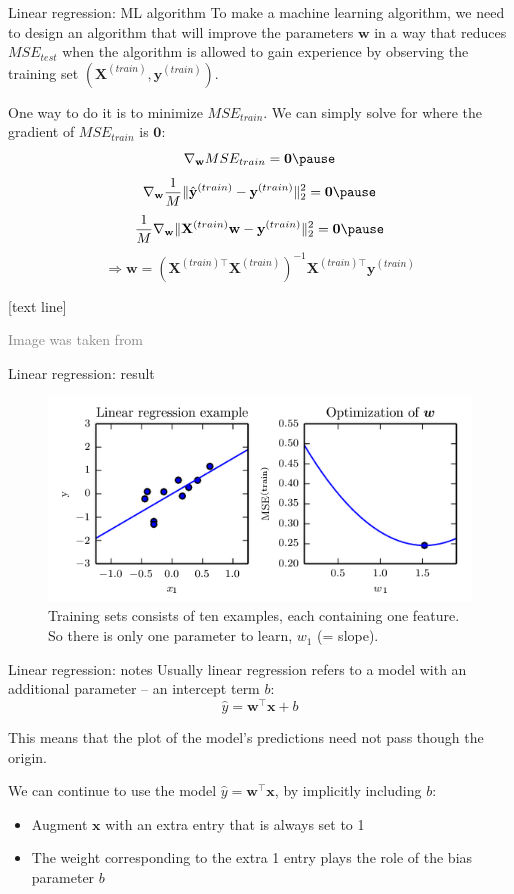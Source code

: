 \documentclass[dvipsnames]{beamer}
\newcommand{\referencefootnote}[1]{\setbeamertemplate{footline}[text line]{%
\parbox{0.9\paperwidth}{\vspace*{-23pt}\tiny{\textcolor{gray}{#1}}\hfill\scriptsize\insertframenumber}}}
\begin{document}
				\begin{frame}{Linear regression: ML algorithm}
				To make a machine learning algorithm, we need to design an algorithm that will improve the parameters $\mathbf{w}$ in a way that reduces $MSE_{test}$ when the algorithm is allowed to gain experience by observing the training set $(\mathbf{X}^{(train)}, \mathbf{y}^{(train)})$. \pause
				
				One way to do it is to minimize $MSE_{train}$. We can simply solve for where the gradient of $MSE_{train}$ is $\mathbf{0}$: \pause
				\[
				\nabla_{\mathbf{w}}MSE_{train} = \mathbf{0} \pause
				\]
				\[
				\nabla_{\mathbf{w}}\frac{1}{M}\|\hat{\mathbf{y}}^{(train)} - \mathbf{y}^{(train)}\|_{2}^{2}  = \mathbf{0} \pause
				\]
				\[
				\frac{1}{M}\nabla_{\mathbf{w}}\|\mathbf{X}^{(train)}\mathbf{w} - \mathbf{y}^{(train)}\|_{2}^{2}  = \mathbf{0} \pause
				\]
				\[
				\Rightarrow \mathbf{w}= (\mathbf{X}^{(train)\top}\mathbf{X}^{(train)})^{-1}\mathbf{X}^{(train)\top}\mathbf{y}^{(train)}
				\]
				
		\end{frame}
		
		{ \referencefootnote{Image was taken from \cite{Goodfellow_et_al_2016}}
			\begin{frame}{Linear regression: result}
				 \begin{figure}
					\center
					\includegraphics[scale=.6]{figures/regression.png} 
					\caption{Training sets consists of ten examples, each containing one feature. So there is only one parameter to learn, $w_1$ (= slope).}
					\end{figure}
		\end{frame}
		}
		\begin{frame}{Linear regression: notes}
		Usually linear regression refers to a model with an additional parameter -- an intercept term $b$:
		\[
		\hat{y} = \mathbf{w}^{\top}\mathbf{x}+b
		\]
		
		This means that the plot of the model's predictions need not pass though the origin.
		
		We can continue to use the model $\hat{y} = \mathbf{w}^{\top}\mathbf{x}$, by implicitly including $b$:
		\begin{itemize}
			\item Augment $\mathbf{x}$ with an extra entry that is always set to 1
			\item The weight corresponding to the extra 1 entry plays the role of the bias parameter $b$
		\end{itemize}
		\end{frame}
		
\end{document}
